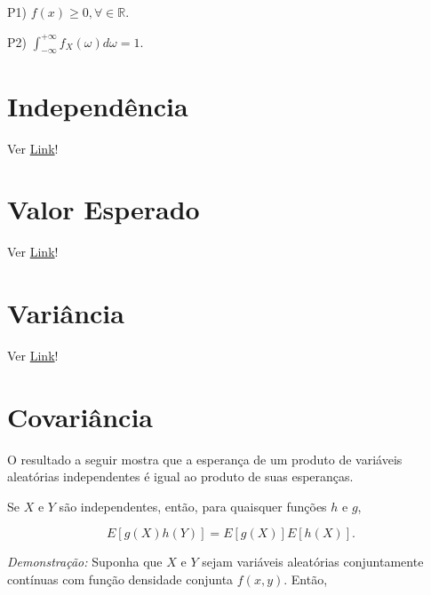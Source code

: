 \documentclass[
  letterpaper,
  DIV=11,
  numbers=noendperiod]{scrreprt}
\begin{document}
P1) \(f(x) \geq 0, \forall \in \mathbb{R}\).

P2) \(\int_{-\infty}^{+\infty} f_X(\omega) d\omega = 1\).

\section{Independência}\label{independuxeancia}

Ver
\href{https://www.ime.usp.br/~leorolla/probabilidade/Ch2.S2.html}{Link}!

\section{Valor Esperado}\label{valor-esperado}

Ver
\href{https://www.ime.usp.br/~leorolla/probabilidade/Ch5.S2.html}{Link}!

\section{Variância}\label{variuxe2ncia}

Ver
\href{https://www.ime.usp.br/~leorolla/probabilidade/Ch6.S1.html}{Link}!

\section{Covariância}\label{covariuxe2ncia}

O resultado a seguir mostra que a esperança de um produto de variáveis
aleatórias independentes é igual ao produto de suas esperanças.

\begin{tcolorbox}[enhanced jigsaw, colback=white, leftrule=.75mm, colbacktitle=quarto-callout-note-color!10!white, breakable, titlerule=0mm, bottomtitle=1mm, title=\textcolor{quarto-callout-note-color}{\faInfo}\hspace{0.5em}{Proposição 1:}, colframe=quarto-callout-note-color-frame, toprule=.15mm, opacityback=0, bottomrule=.15mm, opacitybacktitle=0.6, arc=.35mm, toptitle=1mm, rightrule=.15mm, coltitle=black, left=2mm]

Se \(X\) e \(Y\) são independentes, então, para quaisquer funções \(h\)
e \(g\),

\[E[g(X)h(Y)] = E[g(X)]E[h(X)].\]

\end{tcolorbox}

\emph{Demonstração:} Suponha que \(X\) e \(Y\) sejam variáveis
aleatórias conjuntamente contínuas com função densidade conjunta
\(f(x,y)\). Então,
\end{document}
